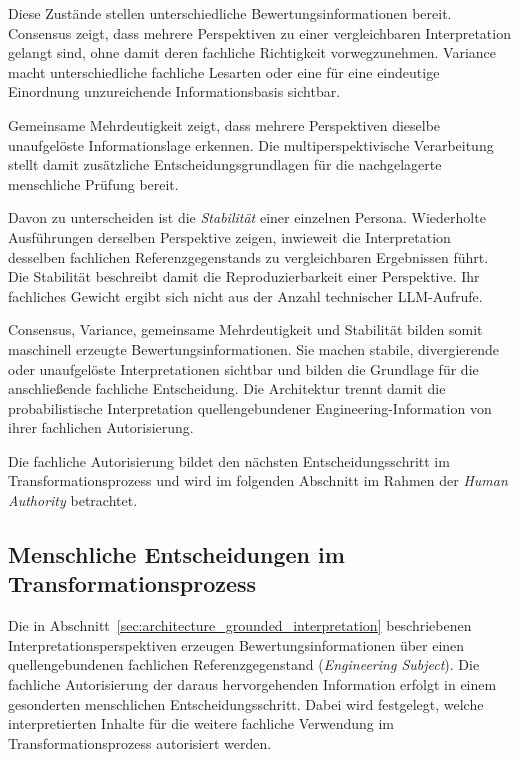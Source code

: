 Diese Zustände stellen unterschiedliche Bewertungsinformationen bereit.
Consensus zeigt, dass mehrere Perspektiven zu einer vergleichbaren
Interpretation gelangt sind, ohne damit deren fachliche Richtigkeit
vorwegzunehmen. Variance macht unterschiedliche fachliche Lesarten oder eine
für eine eindeutige Einordnung unzureichende Informationsbasis sichtbar.

\noindent Gemeinsame Mehrdeutigkeit zeigt, dass mehrere Perspektiven dieselbe
unaufgelöste Informationslage erkennen. Die multiperspektivische
Verarbeitung stellt damit zusätzliche Entscheidungsgrundlagen für die
nachgelagerte menschliche Prüfung bereit.

Davon zu unterscheiden ist die \emph{Stabilität} einer einzelnen Persona.
Wiederholte Ausführungen derselben Perspektive zeigen, inwieweit die
Interpretation desselben fachlichen Referenzgegenstands zu vergleichbaren
Ergebnissen führt. Die Stabilität beschreibt damit die Reproduzierbarkeit
einer Perspektive. Ihr fachliches Gewicht ergibt sich nicht aus der Anzahl
technischer LLM-Aufrufe.

Consensus, Variance, gemeinsame Mehrdeutigkeit und Stabilität bilden somit
maschinell erzeugte Bewertungsinformationen. Sie machen stabile,
divergierende oder unaufgelöste Interpretationen sichtbar und bilden die
Grundlage für die anschließende fachliche Entscheidung. Die Architektur
trennt damit die probabilistische Interpretation quellengebundener
Engineering-Information von ihrer fachlichen Autorisierung.

Die fachliche Autorisierung bildet den nächsten Entscheidungsschritt im
Transformationsprozess und wird im folgenden Abschnitt im Rahmen der
\emph{Human Authority} betrachtet.

\subsection{Menschliche Entscheidungen im Transformationsprozess}
\label{sec:architecture_human_authority}

Die in Abschnitt~\ref{sec:architecture_grounded_interpretation}
beschriebenen Interpretationsperspektiven erzeugen
Bewertungsinformationen über einen quellengebundenen fachlichen
Referenzgegenstand (\emph{Engineering Subject}). Die fachliche Autorisierung
der daraus hervorgehenden Information erfolgt in einem gesonderten
menschlichen Entscheidungsschritt. Dabei wird festgelegt, welche
interpretierten Inhalte für die weitere fachliche Verwendung im
Transformationsprozess autorisiert werden.

